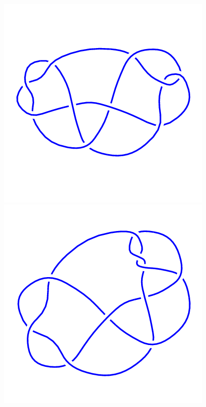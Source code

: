 \begin{figure}[H]
	\begin{minipage}[b]{.18\linewidth}
		\centering
		\includegraphics[width=\linewidth]{../data/10_32.png}
	\end{minipage}
	\begin{minipage}[b]{.18\linewidth}
		\centering
		\includegraphics[width=\linewidth]{../data/10_33.png}

\end{minipage}
\end{figure}
